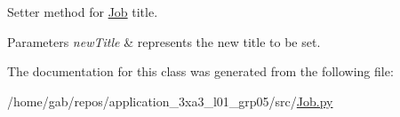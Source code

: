 Setter method for \hyperlink{classJob_1_1Job}{Job} title. 


\begin{DoxyParams}{Parameters}
{\em new\+Title} & represents the new title to be set. \\
\hline
\end{DoxyParams}


The documentation for this class was generated from the following file\+:\begin{DoxyCompactItemize}
\item 
/home/gab/repos/application\+\_\+3xa3\+\_\+l01\+\_\+grp05/src/\hyperlink{Job_8py}{Job.\+py}\end{DoxyCompactItemize}
